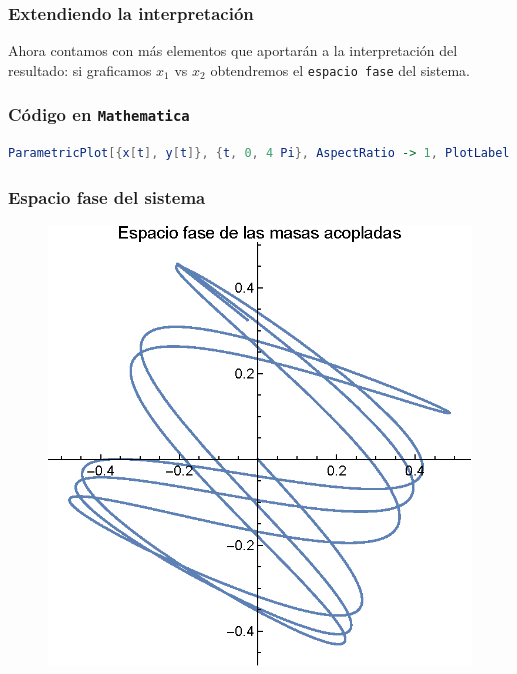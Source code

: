 \begin{frame}   
\frametitle{Extendiendo la interpretación}
Ahora contamos con más elementos que aportarán a la interpretación del resultado: si graficamos $x_{1}$ vs $x_{2}$ obtendremos el \texttt{espacio fase} del sistema.
\end{frame}
\begin{frame}[fragile]
\frametitle{Código en \texttt{Mathematica}}
\begin{lstlisting}[language=Mathematica]
ParametricPlot[{x[t], y[t]}, {t, 0, 4 Pi}, AspectRatio -> 1, PlotLabel -> "Espacio fase de las masas acopladas", LabelStyle -> Directive[FontSize -> 12]]
\end{lstlisting}    
\end{frame}
\begin{frame}
\frametitle{Espacio fase del sistema}
\begin{figure}[H]
    \centering
    \includegraphics[scale=0.7]{Imagenes/Ejercicio_masas_acopladas_03.eps}
\end{figure}
\end{frame}
